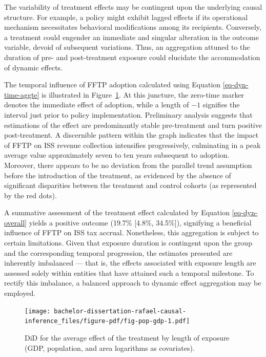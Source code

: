 \documentclass[12pt, a4paper, twoside]{article}
\numberwithin{equation}{subsection} %
\begin{document}
The variability of treatment effects may be contingent upon the
underlying causal structure. For example, a policy might exhibit lagged
effects if its operational mechanism necessitates behavioral
modifications among its recipients. Conversely, a treatment could
engender an immediate and singular alteration in the outcome variable,
devoid of subsequent variations. Thus, an aggregation attuned to the
duration of pre- and post-treatment exposure could elucidate the
accommodation of dynamic effects.

The temporal influence of FFTP adoption calculated using Equation
\eqref{eq-dyn-time-aggte} is illustrated in Figure~\ref{fig-pop-gdp}. At
this juncture, the zero-time marker denotes the immediate effect of
adoption, while a length of \(-1\) signifies the interval just prior to
policy implementation. Preliminary analysis suggests that estimations of
the effect are predominantly stable pre-treatment and turn positive
post-treatment. A discernible pattern within the graph indicates that
the impact of FFTP on ISS revenue collection intensifies progressively,
culminating in a peak average value approximately seven to ten years
subsequent to adoption. Moreover, there appears to be no deviation from
the parallel trend assumption before the introduction of the treatment,
as evidenced by the absence of significant disparities between the
treatment and control cohorts (as represented by the red dots).

A summative assessment of the treatment effect calculated by Equation
\eqref{eq-dyn-overall} yields a positive outcome (19.7\% {[}4.8\%,
34.5\%{]}), signifying a beneficial influence of FFTP on ISS tax
accrual. Nonetheless, this aggregation is subject to certain
limitations. Given that exposure duration is contingent upon the group
and the corresponding temporal progression, the estimates presented are
inherently imbalanced --- that is, the effects associated with exposure
length are assessed solely within entities that have attained such a
temporal milestone. To rectify this imbalance, a balanced approach to
dynamic effect aggregation may be employed.

\begin{figure}[H]

{\centering \texttt{[image: bachelor-dissertation-rafael-causal-inference\_files/figure-pdf/fig-pop-gdp-1.pdf]}

}

\caption{\label{fig-pop-gdp}DiD for the average effect of the treatment
by length of exposure (GDP, population, and area logarithms as
covariates).}

\end{figure}
\end{document}
